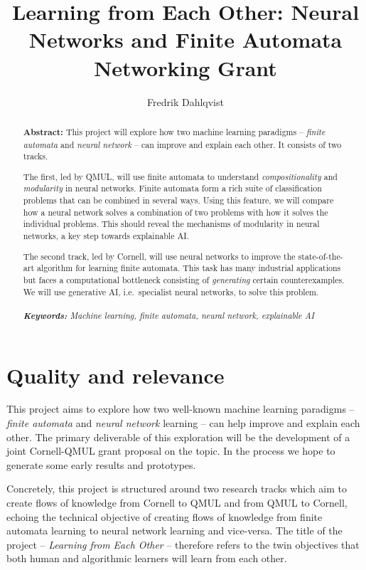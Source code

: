\documentclass[10pt,a4paper]{article}
\title{Learning from Each Other: Neural Networks and Finite Automata \\
	{
		\large Networking Grant
	}
}
\author{Fredrik Dahlqvist}
\date{}
\begin{document}
	
	\maketitle
	
	\begin{abstract}
		\textbf{Abstract:}
		This project will explore how two machine learning paradigms -- \emph{finite automata} and \emph{neural network}  -- can improve and explain each other. It consists of two tracks. 
		
		The first, led by QMUL, will use finite automata to understand \emph{compositionality} and \emph{modularity} in neural networks. Finite automata form a rich suite of classification problems that can be combined in several ways. Using this feature, we will compare how a neural network solves a combination of two problems with how it solves the individual problems. This should reveal the mechanisms of modularity in neural networks, a key step towards explainable AI.
		
		The second track, led by Cornell, will use neural networks to improve the state-of-the-art algorithm for learning finite automata. This task has many industrial applications but faces a computational bottleneck consisting of \emph{generating} certain counterexamples. We will use generative AI, i.e.\ specialist neural networks, to solve this problem.
		\\
		\\
		\textit{\textbf{Keywords:} Machine learning, finite automata, neural network, explainable AI}
	\end{abstract}
	
	\section{Quality and relevance}
	
		This project aims to explore how two well-known machine learning paradigms -- \emph{finite automata} and \emph{neural network} learning -- can help improve and explain each other. The primary deliverable of this exploration will be the development of a joint Cornell-QMUL grant proposal on the topic. In the process we hope to generate some early results and prototypes.
		
		Concretely, this project is structured around two research tracks which aim to create flows of knowledge from Cornell to QMUL and from QMUL to Cornell, echoing the technical objective of creating flows of knowledge from finite automata learning to neural network learning and vice-versa. The title of the project --  \emph{Learning from Each Other} -- therefore refers to the  twin objectives that both human and algorithmic learners will learn from each other. 
		
\end{document}
